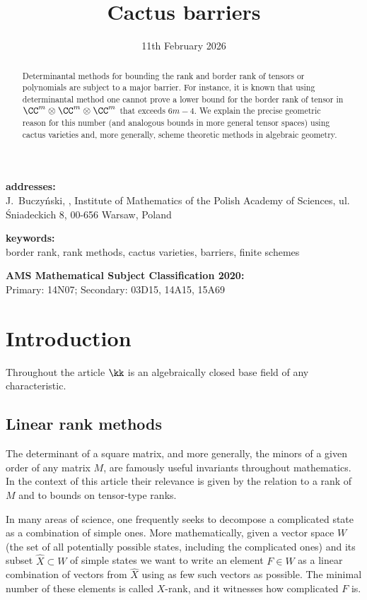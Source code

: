 \documentclass[12pt,a4paper]{article}
\title{Cactus barriers}
\author{\JaBu}
\date{11th February 2026}
\begin{document}
\maketitle
\begin{abstract}
   Determinantal methods for bounding the rank and border rank of tensors or polynomials are subject to a major barrier. 
   For instance, it is known that using determinantal method one cannot prove a lower bound for the border rank of tensor in
   $\CC^m \otimes \CC^m \otimes \CC^m$  that exceeds $6m-4$.
   We explain the precise geometric reason for this number (and analogous bounds in more general tensor spaces) using cactus varieties and, more generally, scheme theoretic methods in algebraic geometry.
\end{abstract}


\medskip
{\footnotesize
\noindent\textbf{addresses:} \\
J.~Buczy\'nski, , 
   Institute of Mathematics of the Polish Academy of Sciences, ul. \'Sniadeckich 8, 00-656 Warsaw, Poland



\noindent\textbf{keywords:}\\
border rank, rank methods, cactus varieties, barriers, finite schemes


\noindent\textbf{AMS Mathematical Subject Classification 2020:}\\
Primary: 14N07; Secondary: 03D15, 14A15, 15A69
}



\section{Introduction}

Throughout the article $\kk$ is
an algebraically closed base field of any characteristic.

\subsection{Linear rank methods}
\label{sec_intro_linear_rank_methods}

The determinant of a square matrix, and more generally, the minors of a given order of any matrix $M$, are famously useful invariants throughout mathematics.
In the context of this article their relevance is given by the relation to a rank of $M$ and to bounds on tensor-type ranks.

In many areas of science, one frequently seeks to decompose a complicated state as a combination of simple ones.
More mathematically, given a vector space $W$ (the set of all potentially possible states, including the complicated ones) and its subset $\hat{X}\subset W$ of simple states we want to write an element $F\in W$ as a linear combination of vectors from $\hat X$ using as few such vectors as possible.
The minimal number of these elements is called $X$-rank, and it witnesses how complicated $F$ is.
\end{document}
